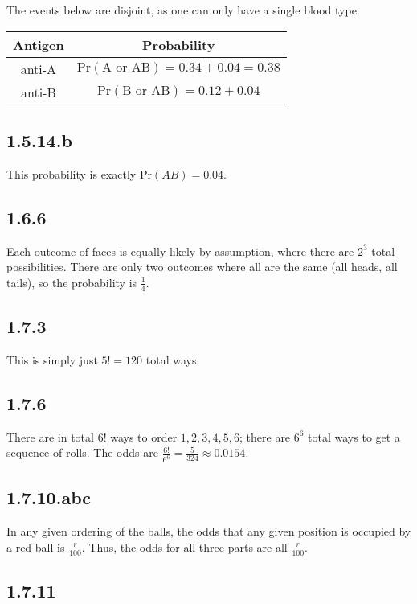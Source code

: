 \documentclass[12pt,letterpaper]{article}
\theoremstyle{definition}
\newcommand{\pr}[1]{\text{Pr}\left(#1\right)}
\begin{document}
The events below are disjoint, as one can only have a single blood type.

\begin{center}
  \begin{tabular}{c|c}
    Antigen & Probability \\
    \hline
    anti-A & $\pr{\text{A or AB}} = 0.34 + 0.04 = 0.38$\\
    anti-B & $\pr{\text{B or AB}} = 0.12 + 0.04$
  \end{tabular}
\end{center}

\subsection*{1.5.14.b}

This probability is exactly $\pr{AB} = 0.04$.

\subsection*{1.6.6}

Each outcome of faces is equally likely by assumption, where there are $2^3$ total
possibilities. There are only two outcomes where all are the same (all heads, all
tails), so the probability is $\frac{1}{4}$.

\subsection*{1.7.3}

This is simply just $5! = 120$ total ways.

\subsection*{1.7.6}

There are in total $6!$ ways to order $1,2,3,4,5,6$; there are $6^6$ total ways
to get a sequence of rolls. The odds are $\frac{6!}{6^6} = \frac{5}{324} \approx 0.0154$.

\subsection*{1.7.10.abc}

In any given ordering of the balls, the odds that any given position is occupied
by a red ball is $\frac{r}{100}$. Thus, the odds for all three parts are all $\frac{r}{100}$.

\subsection*{1.7.11}
\end{document}
